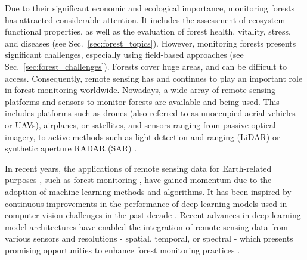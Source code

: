 \documentclass{CUP-JNL-DTM}%
\newcommand{\EL}[1]{\textcolor{orange}{#1}}
\theoremstyle{definition}
\numberwithin{equation}{section}
\begin{document}
Due to their significant economic and ecological importance, monitoring forests has attracted considerable attention. 
It includes the assessment of ecosystem functional properties, as well as the evaluation of forest health, vitality, stress, and diseases (see Sec.~\ref{sec:forest_topics}).
However, monitoring forests presents significant challenges, especially using field-based approaches (see Sec.~\ref{sec:forest_challenges}). 
Forests cover huge areas, and can be difficult to access. 
Consequently, remote sensing has and continues to play an important role in forest monitoring worldwide. 
Nowadays, a wide array of remote sensing platforms and sensors to monitor forests are available and being used. 
This includes platforms such as drones (also referred to as unoccupied aerial vehicles or UAVs), airplanes, or satellites, and sensors ranging from passive optical imagery, to active methods such as light detection and ranging (LiDAR) or synthetic aperture RADAR (SAR) \citep{white_remote_2016, verrelst_optical_2015}.



In recent years, the applications of remote sensing data for Earth-related purposes \cite{campsvalls_deep_2021, ma_deep_2019}, such as forest monitoring \cite{fassnacht_review_2016, kattenborn_review_2021, diez_deep_2021, michalowska_review_2021}, have gained momentum due to the adoption of machine learning methods and algorithms. 
It has been inspired by continuous improvements in the performance of deep learning models used in computer vision challenges in the past decade \cite{deng_imagenet_2009,everingham_pascal_2015,lin_microsoft_2014}.
Recent advances in deep learning model architectures have enabled the integration of remote sensing data from various sensors and resolutions - spatial, temporal, or spectral - which presents promising opportunities to enhance forest monitoring practices \cite{rahaman_general_2022, cong_satmae_2022, reed_scale-mae_2022, tseng_lightweight_2023}.

\end{document}
